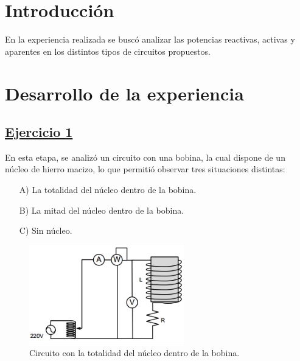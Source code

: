 \documentclass[a4paper]{article}
\begin{document}




\section*{Introducción}

En la experiencia realizada se buscó analizar las potencias reactivas, activas y aparentes en los distintos tipos de circuitos propuestos.

\section*{Desarrollo de la experiencia}

\subsection*{\underline{Ejercicio 1}}

En esta etapa, se analizó un circuito con una bobina, la cual dispone de un núcleo de hierro macizo, lo que permitió observar tres situaciones distintas:
\begin{enumerate}
	\item[A)] La totalidad del núcleo dentro de la bobina.
	\item[B)] La mitad del núcleo dentro de la bobina.
	\item[C)] Sin núcleo.
\end{enumerate}

\begin{figure}[H]
	\centering
	\includegraphics[width=0.6\textwidth]{Circuito-ejercicio-1A}
	\caption{Circuito con la totalidad del núcleo dentro de la bobina.}
	\label{fig:1a}
\end{figure}
\end{document}
